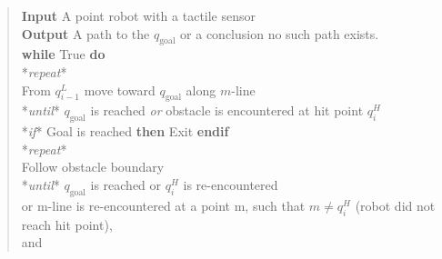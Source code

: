 \begin{quote}
\textbf{Input} A point robot with a tactile sensor\\
\textbf{Output} A path to the \(q_{\text{goal}}\) or a conclusion no
such path exists.\\
\textbf{while} True \textbf{do}\\
\hspace*{0.333em}\hspace*{0.333em}*\emph{repeat}*\\
\hspace*{0.333em}\hspace*{0.333em}\hspace*{0.333em}\hspace*{0.333em}From
\(q^L_{i-1}\) move toward \(q_{\text{goal}}\) along \(m\)-line\\
\hspace*{0.333em}\hspace*{0.333em}*\emph{until}* \(q_{\text{goal}}\) is
reached \emph{or} obstacle is encountered at hit point \(q^H_{i}\)\\
\hspace*{0.333em}\hspace*{0.333em}*\emph{if}* Goal is reached
\textbf{then} Exit \textbf{endif}\\
\hspace*{0.333em}\hspace*{0.333em}*\emph{repeat}*\\
\hspace*{0.333em}\hspace*{0.333em}\hspace*{0.333em}\hspace*{0.333em}Follow
obstacle boundary\\
\hspace*{0.333em}\hspace*{0.333em}*\emph{until}* \(q_{\text{goal}}\) is
reached or \(q^H_{i}\) is re-encountered\\
\hspace*{0.333em}\hspace*{0.333em}\hspace*{0.333em}\hspace*{0.333em}or
m-line is re-encountered at a point m, such that \(m\neq q^H_{i}\)
(robot did not reach hit point),\\
\hspace*{0.333em}\hspace*{0.333em}\hspace*{0.333em}\hspace*{0.333em}and

\end{quote}
